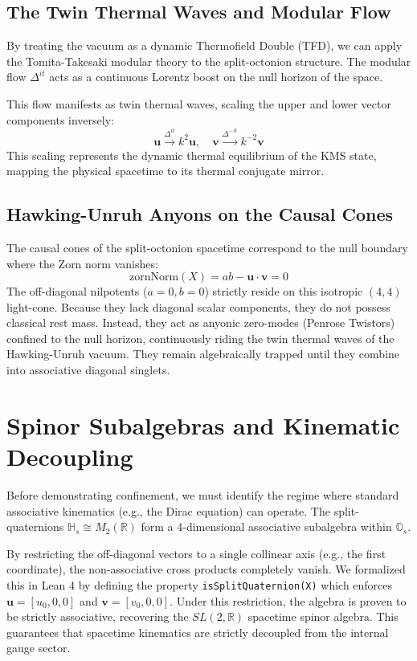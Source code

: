 \documentclass[11pt,a4paper]{article}
\begin{document}
\subsection{The Twin Thermal Waves and Modular Flow}
By treating the vacuum as a dynamic Thermofield Double (TFD), we can apply the Tomita-Takesaki modular theory to the split-octonion structure. The modular flow $\Delta^{it}$ acts as a continuous Lorentz boost on the null horizon of the space. 

This flow manifests as twin thermal waves, scaling the upper and lower vector components inversely:
\begin{equation}
\mathbf{u} \xrightarrow{\Delta^{it}} k^2 \mathbf{u}, \quad \mathbf{v} \xrightarrow{\Delta^{-it}} k^{-2} \mathbf{v}
\end{equation}
This scaling represents the dynamic thermal equilibrium of the KMS state, mapping the physical spacetime to its thermal conjugate mirror.

\subsection{Hawking-Unruh Anyons on the Causal Cones}
The causal cones of the split-octonion spacetime correspond to the null boundary where the Zorn norm vanishes:
\begin{equation}
\text{zornNorm}(X) = ab - \mathbf{u} \cdot \mathbf{v} = 0
\end{equation}
The off-diagonal nilpotents ($a=0, b=0$) strictly reside on this isotropic $(4,4)$ light-cone. Because they lack diagonal scalar components, they do not possess classical rest mass. Instead, they act as anyonic zero-modes (Penrose Twistors) confined to the null horizon, continuously riding the twin thermal waves of the Hawking-Unruh vacuum. They remain algebraically trapped until they combine into associative diagonal singlets.

\section{Spinor Subalgebras and Kinematic Decoupling}

Before demonstrating confinement, we must identify the regime where standard associative kinematics (e.g., the Dirac equation) can operate. The split-quaternions $\mathbb{H}_s \cong M_2(\mathbb{R})$ form a 4-dimensional associative subalgebra within $\mathbb{O}_s$. 

By restricting the off-diagonal vectors to a single collinear axis (e.g., the first coordinate), the non-associative cross products completely vanish. We formalized this in Lean 4 by defining the property \texttt{isSplitQuaternion(X)} which enforces $\mathbf{u} = [u_0, 0, 0]$ and $\mathbf{v} = [v_0, 0, 0]$. Under this restriction, the algebra is proven to be strictly associative, recovering the $SL(2, \mathbb{R})$ spacetime spinor algebra. This guarantees that spacetime kinematics are strictly decoupled from the internal gauge sector.
\end{document}
